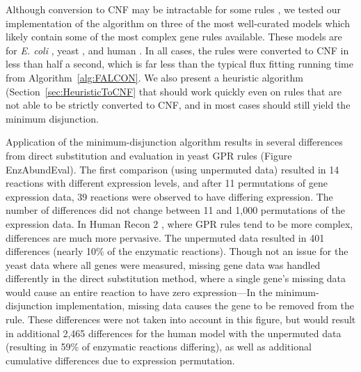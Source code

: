 Although conversion to CNF may be intractable for some rules
\citep{Russell2009}, we tested our implementation of the algorithm on
three of the most well-curated models which likely contain some of the
most complex gene rules available. These models are for \textit{E. coli}
\citep{Orth2011a}, yeast \citep{Aung2013}, and human
\citep{Thiele2013}. In all cases, the rules were converted to CNF in
less than half a second, which is far less than the typical flux
fitting running time from Algorithm~\ref{alg:FALCON}. We also present
a heuristic algorithm (Section~\ref{sec:HeuristicToCNF} that should
work quickly even on rules that are not able to be strictly converted
to CNF, and in most cases should still yield the minimum disjunction.

Application of the minimum-disjunction algorithm results in several
differences from direct substitution and evaluation in yeast GPR rules
(Figure EnzAbundEval). The first comparison (using unpermuted data)
resulted in 14 reactions with different expression levels, and after
11 permutations of gene expression data, 39 reactions were observed to have differing
expression. The number of differences did not change between 11 and
1,000 permutations of the expression data. In Human Recon 2 \citep{Thiele2013}, where GPR
rules tend to be more complex, differences are much more
pervasive. The unpermuted data resulted in 401 differences (nearly
10\% of the enzymatic reactions). Though not an issue for the yeast
data where all genes were measured, missing gene data was handled
differently in the direct substitution method, where a single gene's
missing data would cause an entire reaction to have zero
expression---In the minimum-disjunction implementation, missing data
causes the gene to be removed from the rule. These differences were
not taken into account in this figure, but would result in additional
2,465 differences for the human model with the unpermuted data
(resulting in 59\% of enzymatic reactions differing), as well as
additional cumulative differences due to expression permutation.

%
%

